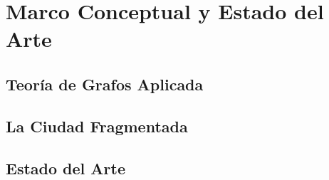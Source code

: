 
\section{Marco Conceptual y Estado del Arte}
\label{section:marco-conceptual}
\lipsum[5]

\subsection{Teoría de Grafos Aplicada}
\label{subsection:teoria-grafos-aplicada}
\lipsum[5]


\lipsum[6]

\subsection{La Ciudad Fragmentada}
\label{subsection:ciudad-fragmentada}
\lipsum[7-8]


\subsection{Estado del Arte}
\label{subsection:estado-arte}

\lipsum[9-10]

